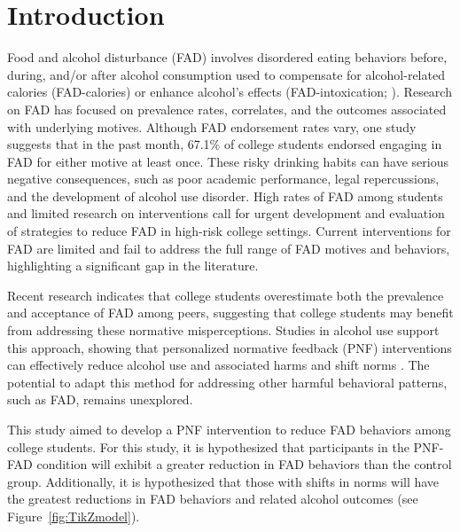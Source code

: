 \section{Introduction}

Food and alcohol disturbance (FAD) involves disordered eating behaviors before, during, and/or after alcohol consumption used to compensate for alcohol-related calories (FAD-calories) or enhance alcohol’s effects (FAD-intoxication; \citep{Choquette2018}). Research on FAD has focused on prevalence rates, correlates, and the outcomes associated with underlying motives. Although FAD endorsement rates vary, one study suggests that in the past month, 67.1\% of college students endorsed engaging in FAD for either motive at least once. These risky drinking habits can have serious negative consequences, such as poor academic performance, legal repercussions, and the development of alcohol use disorder. High rates of FAD among students and limited research on interventions call for urgent development and evaluation of strategies to reduce FAD in high-risk college settings. Current interventions for FAD are limited and fail to address the full range of FAD motives and behaviors, highlighting a significant gap in the literature.

Recent research indicates that college students overestimate both the prevalence and acceptance of FAD among peers, suggesting that college students may benefit from addressing these normative misperceptions. Studies in alcohol use support this approach, showing that personalized normative feedback (PNF) interventions can effectively reduce alcohol use and associated harms and shift norms \citep{Lewis2007} \citep{Young2019}. The potential to adapt this method for addressing other harmful behavioral patterns, such as FAD, remains unexplored.

This study aimed to develop a PNF intervention to reduce FAD behaviors among college students. For this study, it is hypothesized that participants in the PNF-FAD condition will exhibit a greater reduction in FAD behaviors than the control group. Additionally, it is hypothesized that those with shifts in norms will have the greatest reductions in FAD behaviors and related alcohol outcomes (see Figure~\ref{fig:TikZmodel}).
